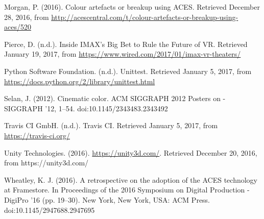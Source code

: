 \documentclass[conference]{IEEEtran}
\begin{document}
\begin{thebibliography}{1}
\renewcommand\@biblabel[1]{[Mor16]}
\bibitem{}
Morgan, P. (2016). Colour artefacts or breakup using ACES. Retrieved December 28, 2016, from \url{http://acescentral.com/t/colour-artefacts-or-breakup-using-aces/520} \vspace{2mm}

\renewcommand\@biblabel[1]{[Pie20]}
\bibitem{}
Pierce, D. (n.d.). Inside IMAX’s Big Bet to Rule the Future of VR. Retrieved January 19, 2017, from \url{https://www.wired.com/2017/01/imax-vr-theaters/} \vspace{2mm}

\renewcommand\@biblabel[1]{[Pyt17]}
\bibitem{}
Python Software Foundation. (n.d.). Unittest. Retrieved January 5, 2017, from \url{https://docs.python.org/2/library/unittest.html} \vspace{2mm}

\renewcommand\@biblabel[1]{[Sel12]}
\bibitem{}
Selan, J. (2012). Cinematic color. ACM SIGGRAPH 2012 Posters on - SIGGRAPH ’12, 1–54. doi:10.1145/2343483.2343492 \vspace{2mm}

\renewcommand\@biblabel[1]{[Trav17]}
\bibitem{}
Travis CI GmbH. (n.d.). Travis CI. Retrieved January 5, 2017, from \url{https://travis-ci.org/} \vspace{2mm}

\renewcommand\@biblabel[1]{[Uni16]}
\bibitem{}
Unity Technologies. (2016). \url{https://unity3d.com/}. Retrieved December 20, 2016, from {https://unity3d.com/} \vspace{2mm}

\renewcommand\@biblabel[1]{[Whe16]}
\bibitem{}
Wheatley, K. J. (2016). A retrospective on the adoption of the ACES technology at Framestore. In Proceedings of the 2016 Symposium on Digital Production - DigiPro ’16 (pp. 19–30). New York, New York, USA: ACM Press. doi:10.1145/2947688.2947695 \vspace{2mm}

\end{thebibliography}
\end{document}
